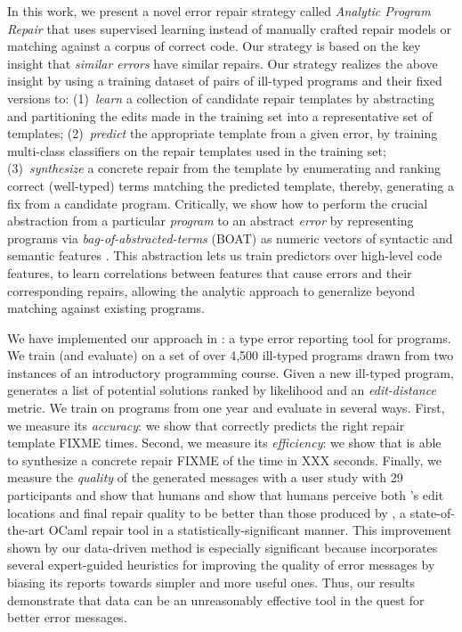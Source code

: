 %
In this work, we present a novel error repair
strategy called \emph{Analytic Program Repair}
that uses supervised learning instead of manually
crafted repair models or matching against a corpus
of correct code.
%
Our strategy is based on the key insight that
\emph{similar errors} have similar repairs.
%
Our strategy realizes the above insight by using
a training dataset of pairs of ill-typed programs
and their fixed versions to:
%
(1)~\emph{learn} a collection of candidate repair templates
    by abstracting and partitioning the edits made in the
    training set into a representative set of templates;
%
(2)~\emph{predict} the appropriate template from a given error,
    by training multi-class classifiers on the repair templates
    used in the training set;
%
(3)~\emph{synthesize} a concrete repair from the template
   by enumerating and ranking correct (\eg well-typed)
   terms matching the predicted template,
%
thereby, generating a fix from a candidate program.
%
Critically, we show how to perform the crucial abstraction
from a particular \emph{program} to an abstract \emph{error}
by representing programs via \emph{bag-of-abstracted-terms} (BOAT)
\ie as numeric vectors of syntactic and semantic features \citep{Seidel2017-ko}.
%
This abstraction lets us train predictors over high-level
code features, \ie to learn correlations between features
that cause errors and their corresponding repairs, allowing
the analytic approach to generalize beyond matching against
existing programs.

\mypara{\toolname}
%
We have implemented our approach in \toolname: a type error reporting
tool for \ocaml programs. We train (and evaluate) \toolname on a set of
over 4,500 ill-typed \ocaml programs drawn from two instances of an
introductory programming course.
%
Given a new ill-typed program, \toolname generates a list of potential
solutions ranked by likelihood and an \emph{edit-distance} metric.
We train \toolname on programs from one year and evaluate in several
ways.
%
First, we measure its \emph{accuracy}: we show that \toolname correctly
predicts the right repair template {FIXME} times.
%
Second, we measure its \emph{efficiency}: we show that \toolname is able
to synthesize a concrete repair {FIXME} of the time in XXX seconds.
%
Finally, we measure the \emph{quality} of the generated messages with
a user study with 29 participants and show that humans and show that
humans perceive both \toolname's edit locations and final repair quality
to be better than those produced by \seminal, a state-of-the-art OCaml
repair tool \citep{Lerner2007-dt} in a statistically-significant manner.
%
This improvement shown by our data-driven method is especially
significant because \seminal incorporates several expert-guided
heuristics for improving the quality of error messages by biasing
its reports towards simpler and more useful ones.
%
Thus, our results demonstrate that data can be an unreasonably
effective tool in the quest for better error messages.


